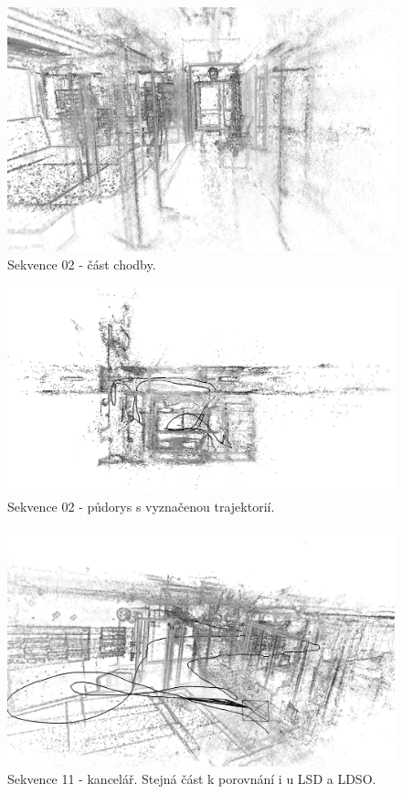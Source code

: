 \documentclass[12pt,a4paper]{article}
\begin{document}
\begin{figure}[H]
\centering
\includegraphics[width=1.0\textwidth]{img/DSO_02_chodba.png}
\caption{Sekvence 02 - část chodby.}
\end{figure} 

\begin{figure}[H]
\centering
\includegraphics[width=1.0\textwidth]{img/DSO_02_top_b.png}
\caption{Sekvence 02 - půdorys s vyznačenou trajektorií.}
\end{figure} 

\begin{figure}[H]
\centering
\includegraphics[width=1.0\textwidth]{img/DSO_11_kancl_b.png}
\caption{Sekvence 11 - kancelář. Stejná část k porovnání i u LSD a LDSO.}
\end{figure} 
\end{document}
